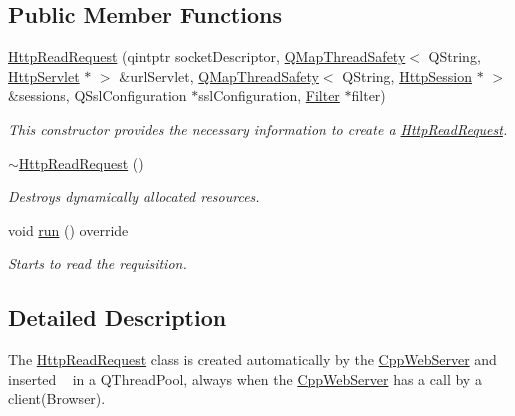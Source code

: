 \subsection*{Public Member Functions}
\begin{DoxyCompactItemize}
\item 
\hyperlink{class_c_w_f_1_1_http_read_request_ade7aa5ac198bb40ce98de9f9ac9ff4d2}{Http\+Read\+Request} (qintptr socket\+Descriptor, \hyperlink{class_c_w_f_1_1_q_map_thread_safety}{Q\+Map\+Thread\+Safety}$<$ Q\+String, \hyperlink{class_c_w_f_1_1_http_servlet}{Http\+Servlet} $\ast$ $>$ \&url\+Servlet, \hyperlink{class_c_w_f_1_1_q_map_thread_safety}{Q\+Map\+Thread\+Safety}$<$ Q\+String, \hyperlink{class_c_w_f_1_1_http_session}{Http\+Session} $\ast$ $>$ \&sessions, Q\+Ssl\+Configuration $\ast$ssl\+Configuration, \hyperlink{class_c_w_f_1_1_filter}{Filter} $\ast$filter)
\begin{DoxyCompactList}\small\item\em This constructor provides the necessary information to create a \hyperlink{class_c_w_f_1_1_http_read_request}{Http\+Read\+Request}. \end{DoxyCompactList}\item 
\hyperlink{class_c_w_f_1_1_http_read_request_ad2013577721f188ab3e94c9b977fe3ee}{$\sim$\+Http\+Read\+Request} ()
\begin{DoxyCompactList}\small\item\em Destroys dynamically allocated resources. \end{DoxyCompactList}\item 
void \hyperlink{class_c_w_f_1_1_http_read_request_a8c7de493baefa696920be2588129f5fd}{run} () override
\begin{DoxyCompactList}\small\item\em Starts to read the requisition. \end{DoxyCompactList}\end{DoxyCompactItemize}


\subsection{Detailed Description}
The \hyperlink{class_c_w_f_1_1_http_read_request}{Http\+Read\+Request} class is created automatically by the \hyperlink{class_c_w_f_1_1_cpp_web_server}{Cpp\+Web\+Server} and inserted ~\newline
 in a Q\+Thread\+Pool, always when the \hyperlink{class_c_w_f_1_1_cpp_web_server}{Cpp\+Web\+Server} has a call by a client(\+Browser). 

